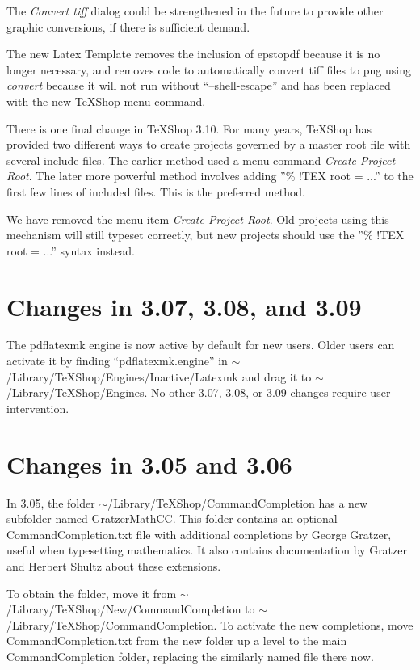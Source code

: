 \documentclass[11pt, oneside]{amsart}
\begin{document}
The {\em Convert tiff} dialog could be strengthened in the future to provide other graphic conversions, if there is sufficient demand.

The new Latex Template removes the inclusion of epstopdf because it is no longer necessary, and removes  code to automatically convert tiff files to png using {\em convert} because it will not run without ``--shell-escape'' and has been replaced with the new TeXShop menu command.




There is one final change in TeXShop 3.10. For many years, TeXShop has provided two different ways to create projects governed by a master root file with several include files. The earlier method used a menu command {\em Create Project Root}. The later more powerful method involves adding ''\% !TEX root = ...'' to the
first few lines of included files. This is the preferred method.

We have  removed the menu item {\em Create Project Root}. Old projects using this mechanism will still typeset correctly, but new projects should use the  
''\% !TEX root = ...'' syntax instead.

\section{Changes in 3.07, 3.08, and 3.09}

The pdflatexmk engine is now active by default for new users. Older users can activate it by finding ``pdflatexmk.engine'' in $\sim$/Library/TeXShop/Engines/Inactive/Latexmk
and drag it to $\sim$/Library/TeXShop/Engines. No other 3.07, 3.08, or 3.09 changes require user intervention.

\section{Changes in 3.05 and 3.06}

In 3.05, the folder $\sim$/Library/TeXShop/CommandCompletion  has a new subfolder named GratzerMathCC. This folder contains
an optional CommandCompletion.txt file with additional completions by George Gratzer, useful when typesetting mathematics.
It also contains documentation by Gratzer and Herbert Shultz about these extensions.

To obtain the folder, move it from $\sim$/Library/TeXShop/New/CommandCompletion to $\sim$/Library/TeXShop/CommandCompletion.
To activate the new completions, move CommandCompletion.txt from the new folder up a level to the main CommandCompletion
folder, replacing the similarly named file there now.
\end{document}
